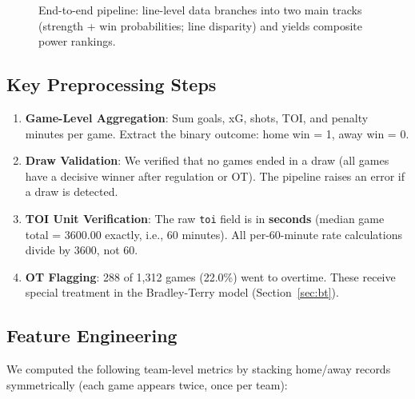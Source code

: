 \documentclass[11pt, a4paper]{article}
\begin{document}
\begin{figure}[H]
\caption{End-to-end pipeline: line-level data branches into two main tracks (strength + win probabilities; line disparity) and yields composite power rankings.}
\label{fig:pipeline}
\end{figure}

\subsection{Key Preprocessing Steps}

\begin{enumerate}
    \item \textbf{Game-Level Aggregation}: Sum goals, xG, shots, TOI, and penalty minutes per game. Extract the binary outcome: home win = 1, away win = 0.
    \item \textbf{Draw Validation}: We verified that no games ended in a draw (all games have a decisive winner after regulation or OT). The pipeline raises an error if a draw is detected.
    \item \textbf{TOI Unit Verification}: The raw \texttt{toi} field is in \textbf{seconds} (median game total = 3600.00 exactly, i.e., 60 minutes). All per-60-minute rate calculations divide by 3600, not 60.
    \item \textbf{OT Flagging}: 288 of 1,312 games (22.0\%) went to overtime. These receive special treatment in the Bradley-Terry model (Section~\ref{sec:bt}).
\end{enumerate}

\subsection{Feature Engineering}

We computed the following team-level metrics by stacking home/away records symmetrically (each game appears twice, once per team):
\end{document}
